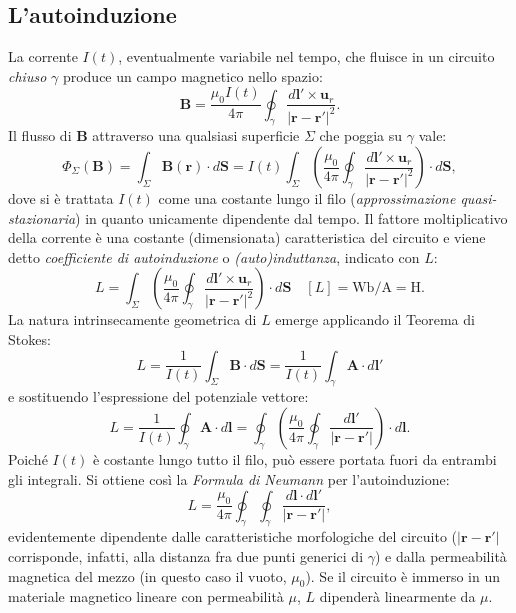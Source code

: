 \documentclass[a4paper,11pt]{report}
\begin{document}
\subsection{L'autoinduzione}
La corrente $I(t)$, eventualmente variabile nel tempo, che fluisce in un circuito \textit{chiuso} $\gamma$ produce un campo magnetico nello spazio:
\begin{equation}
\bm{B} = \frac{\mu_0 I(t)}{4\pi} \oint_\gamma \frac{d\bm{l}' \times \bm{u}_r}{|\bm{r}-\bm{r}'|^2}.
\end{equation}
Il flusso di $\bm{B}$ attraverso una qualsiasi superficie $\Sigma$ che poggia su $\gamma$ vale:
\begin{equation}
\Phi_\Sigma(\bm{B}) = \int_\Sigma \bm{B}(\bm{r}) \cdot d\bm{S} =I(t)\int_\Sigma \left(\frac{\mu_0 }{4\pi} \oint_\gamma \frac{d\bm{l}' \times \bm{u}_r}{|\bm{r}-\bm{r}'|^2}\right) \cdot d\bm{S},
\end{equation}
 dove si è trattata $I(t)$ come una costante lungo il filo (\textit{approssimazione quasi-stazionaria}) in quanto unicamente dipendente dal tempo. Il fattore moltiplicativo della corrente è una costante (dimensionata) caratteristica del circuito e viene detto \textit{coefficiente di autoinduzione} o \textit{(auto)induttanza}, indicato con $L$:
 \begin{equation}
L = \int_\Sigma \left(\frac{\mu_0 }{4\pi} \oint_\gamma \frac{d\bm{l}' \times \bm{u}_r}{|\bm{r}-\bm{r}'|^2}\right) \cdot d\bm{S} \quad [L] =  \si{\weber\per\ampere} = \si{\henry}.
\end{equation}
La natura intrinsecamente geometrica di $L$ emerge applicando il Teorema di Stokes:
 \begin{equation}
L = \frac{1}{I(t)}\int_\Sigma \bm{B} \cdot d\bm{S} = \frac{1}{I(t)}\int_\gamma \bm{A} \cdot d\bm{l}'
\end{equation}
e sostituendo l'espressione del potenziale vettore:
\begin{equation}
L = \frac{1}{I(t)} \oint_\gamma \bm{A} \cdot d\bm{l} = \oint_\gamma \left( \frac{\mu_0 }{4\pi} \oint_\gamma \frac{d\bm{l}'}{|\bm{r}-\bm{r}'|} \right) \cdot d\bm{l}.
\end{equation}
Poiché $I(t)$ è costante lungo tutto il filo, può essere portata fuori da entrambi gli integrali. Si ottiene così la \textit{Formula di Neumann} per l'autoinduzione:
\begin{equation}
L = \frac{\mu_0}{4\pi} \oint_\gamma \oint_\gamma \frac{d\bm{l} \cdot d\bm{l}'}{|\bm{r}-\bm{r}'|},
\end{equation}
evidentemente dipendente dalle caratteristiche morfologiche del circuito ($|\bm{r}-\bm{r}'|$ corrisponde, infatti, alla distanza fra due punti generici di $\gamma$) e dalla permeabilità magnetica del mezzo (in questo caso il vuoto, $\mu_0$). Se il circuito è immerso in un materiale magnetico lineare con permeabilità $\mu$, $L$ dipenderà linearmente da $\mu$.
\end{document}
